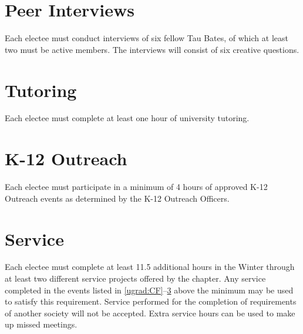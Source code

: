 \section{Peer Interviews} Each electee must conduct interviews of six fellow Tau Bates, of which at least two must be active members. The interviews will consist of six creative questions. 
\section{Tutoring} Each electee must complete at least one hour of university tutoring. %
\section{K-12 Outreach} \label{ugrad:MindSET} Each electee must participate in a minimum of 4 hours of approved K-12 Outreach events as determined by the K-12 Outreach Officers. %
\section{Service} Each electee must complete at least 11.5 additional hours in the Winter through at least two different service projects offered by the chapter. Any service completed in the events listed in \ref{ugrad:CF}--\ref{ugrad:MindSET} above the minimum may be used to satisfy this requirement.  Service performed for the completion of requirements of another society will not be accepted. Extra service hours can be used to make up missed meetings. %


